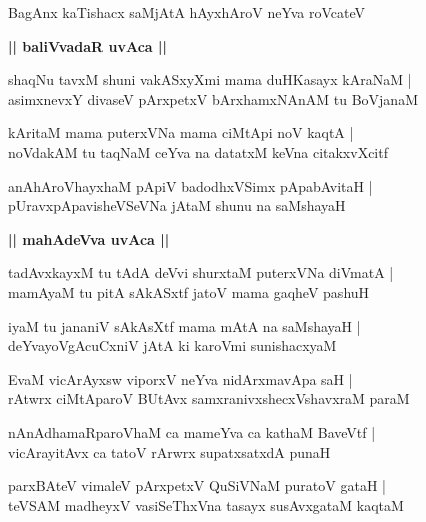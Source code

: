 \documentclass[twoside,12pt,openright]{book}
\newcounter{shloka}[chapter]
\def\uvaca#1{\centerline{{\large\textbf{#1}}}}
\begin{document}
\begin{shloka}%
BagAnx kaTishacx saMjAtA hAyxhAroV neYva roVcateV 
\end{shloka}

\uvaca{|| baliVvadaR uvAca ||}

\begin{shloka}%
shaqNu tavxM shuni vakASxyXmi mama duHKasayx kAraNaM |\\
asimxnevxY divaseV pArxpetxV bArxhamxNAnAM tu BoVjanaM 
\end{shloka}

\begin{shloka}%
kAritaM mama puterxVNa mama ciMtApi noV kaqtA |\\
noVdakAM tu taqNaM ceYva na datatxM keVna citakxvXcitf 
\end{shloka}

\begin{shloka}%
anAhAroVhayxhaM pApiV badodhxVSimx pApabAvitaH |\\
pUravxpApavisheVSeVNa jAtaM shunu na saMshayaH
\end{shloka}

\uvaca{|| mahAdeVva uvAca ||}

\begin{shloka}%
tadAvxkayxM tu tAdA deVvi shurxtaM puterxVNa diVmatA |\\
mamAyaM tu pitA sAkASxtf jatoV mama gaqheV pashuH 
\end{shloka}

\begin{shloka}%
iyaM tu jananiV sAkAsXtf mama mAtA na saMshayaH |\\
deYvayoVgAcuCxniV jAtA ki karoVmi sunishacxyaM 
\end{shloka}

\begin{shloka}%
EvaM vicArAyxsw viporxV neYva nidArxmavApa saH |\\
rAtwrx ciMtAparoV BUtAvx samxranivxshecxVshavxraM paraM 
\end{shloka}

\begin{shloka}%
nAnAdhamaRparoVhaM ca mameYva ca kathaM BaveVtf |\\
vicArayitAvx ca tatoV rArwrx supatxsatxdA punaH 
\end{shloka}

\begin{shloka}%
parxBAteV vimaleV pArxpetxV QuSiVNaM puratoV gataH |\\
teVSAM madheyxV vasiSeThxVna tasayx susAvxgataM kaqtaM 
\end{shloka}
\end{document}
